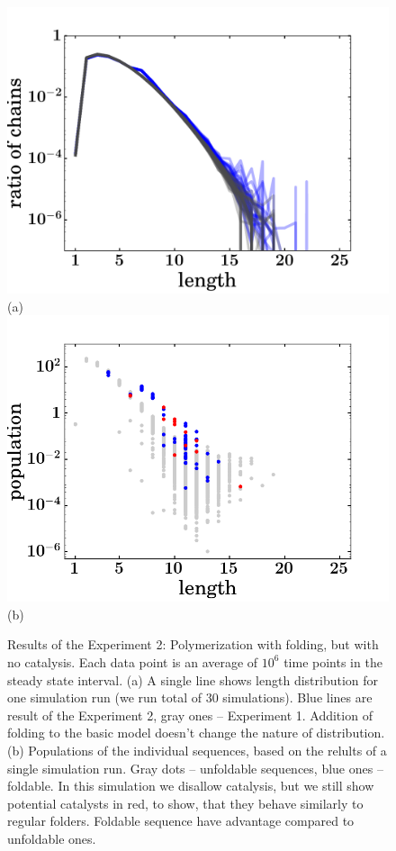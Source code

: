 \documentclass[journal=jacsat,manuscript=article,layout=twocolumn]{achemso}
\begin{document}
\begin{figure}[hbt!]
  \centering
  \includegraphics[width=0.9\columnwidth]{pictures/distr-folded-many.pdf} (a)
   \includegraphics[width=0.9\columnwidth]{pictures/scatter209.png}(b)
  \caption{\footnotesize{Results of the Experiment 2: Polymerization with folding, but with no 
catalysis. Each data point is an average of $10^6$ time points in the steady state interval. (a) 
A single line shows length distribution for one simulation run (we run total of 30 simulations). 
Blue lines are result of the Experiment 2, gray ones -- Experiment 1. Addition of folding to the 
basic model doesn't change the nature of distribution. (b) Populations of the individual sequences, 
based on the relults of a single simulation run. Gray dots -- unfoldable sequences, blue ones -- 
foldable. In this simulation we disallow catalysis, but we still show potential catalysts in red, 
to 
show, that they 
behave similarly to regular folders. Foldable sequence have advantage compared to unfoldable ones.}}
  \label{fig:sim.flory-fold}
\end{figure}
\end{document}
